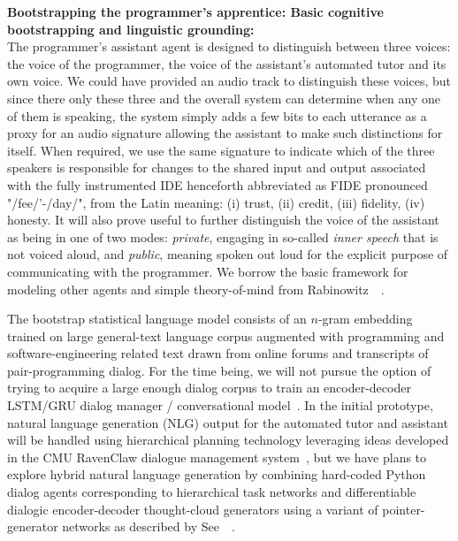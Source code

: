 {\bf{Bootstrapping the programmer's apprentice: Basic cognitive bootstrapping and linguistic grounding:}}\\

The programmer's assistant agent is designed to distinguish between three voices: the voice of the programmer, the voice of the assistant's automated tutor and its own voice. We could have provided an audio track to distinguish these voices, but since there only these three and the overall system can determine when any one of them is speaking, the system simply adds a few bits to each utterance as a proxy for an audio signature allowing the assistant to make such distinctions for itself. When required, we use the same signature to indicate which of the three speakers is responsible for changes to the shared input and output associated with the fully instrumented IDE henceforth abbreviated as FIDE \emdash{} pronounced "/fee/'-/day/", from the Latin meaning: (i) trust, (ii) credit, (iii) fidelity, (iv) honesty. It will also prove useful to further distinguish the voice of the assistant as being in one of two modes: {\it{private}}, engaging in so-called {\it{inner speech}} that is not voiced aloud, and {\it{public}}, meaning spoken out loud for the explicit purpose of communicating with the programmer. We borrow the basic framework for modeling other agents and simple theory-of-mind from Rabinowitz~\etal{}~\cite{RabinowitzetalCoRR-18}.

The bootstrap statistical language model consists of an $n$-gram embedding trained on large general-text language corpus augmented with programming and software-engineering related text drawn from online forums and transcripts of pair-programming dialog. For the time being, we will not pursue the option of trying to acquire a large enough dialog corpus to train an encoder-decoder LSTM/GRU dialog manager / conversational model~\cite{VinyalsandLeICML-15}. In the initial prototype, natural language generation (NLG) output for the automated tutor and assistant will be handled using hierarchical planning technology leveraging ideas developed in the CMU RavenClaw dialogue management system~\cite{BohusandRudnickyCS-09}, but we have plans to explore hybrid natural language generation by combining hard-coded Python dialog agents corresponding to hierarchical task networks and differentiable dialogic encoder-decoder thought-cloud generators using a variant of pointer-generator networks as described by See~\etal{}~\cite{SeeetalACL-17}.

